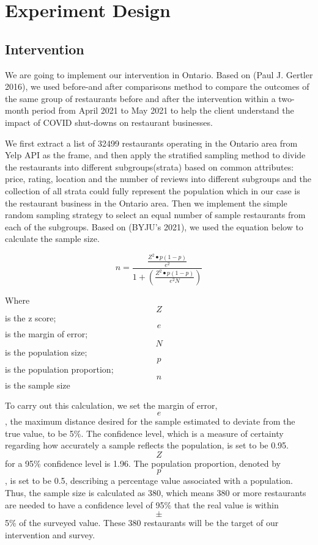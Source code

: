 \documentclass[
]{article}
\begin{document}
\newpage

\hypertarget{experiment-design}{%
\section{Experiment Design}\label{experiment-design}}

\hypertarget{intervention}{%
\subsection{Intervention}\label{intervention}}

We are going to implement our intervention in Ontario. Based on (Paul J. Gertler 2016), we used before-and after comparisons method to compare the outcomes of the same group of restaurants before and after the intervention within a two-month period from April 2021 to May 2021 to help the client understand the impact of COVID shut-downs on restaurant businesses.

We first extract a list of 32499 restaurants operating in the Ontario area from Yelp API as the frame, and then apply the stratified sampling method to divide the restaurants into different subgroups(strata) based on common attributes: price, rating, location and the number of reviews into different subgroups and the collection of all strata could fully represent the population which in our case is the restaurant business in the Ontario area. Then we implement the simple random sampling strategy to select an equal number of sample restaurants from each of the subgroups. Based on (BYJU's 2021), we used the equation below to calculate the sample size.

\begin{equation}
n= \frac{\frac{Z^2 \bullet p(1-p)}{e^2}}{1+(\frac{Z^2\bullet p(1-p)}{e^2N})} \label{eq:sampleSize}
\end{equation}

Where \[Z\] is the z score;
\[e\] is the margin of error;
\[N\] is the population size;
\[p\] is the population proportion;
\[n\] is the sample size

To carry out this calculation, we set the margin of error, \[e\], the maximum distance desired for the sample estimated to deviate from the true value, to be 5\%. The confidence level, which is a measure of certainty regarding how accurately a sample reflects the population, is set to be 0.95. \[Z\] for a 95\% confidence level is 1.96. The population proportion, denoted by \[p\], is set to be 0.5, describing a percentage value associated with a population. Thus, the sample size is calculated as 380, which means 380 or more restaurants are needed to have a confidence level of 95\% that the real value is within \[\pm\]5\% of the surveyed value. These 380 restaurants will be the target of our intervention and survey.
\end{document}

